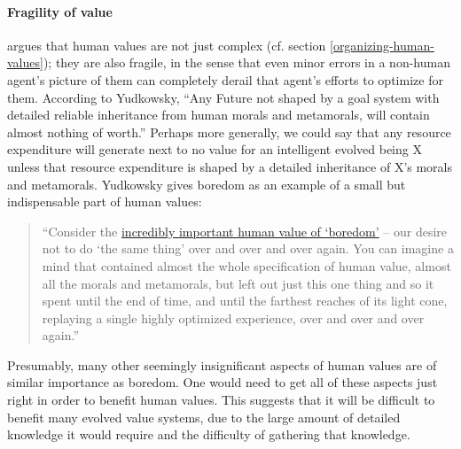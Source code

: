 \hypertarget{fragility-of-value}{\paragraph{Fragility of
value}\label{fragility-of-value}}

\citet[ch. 279]{Yudkowsky2015-tz} argues that human
values are not just complex (cf. section
\ref{organizing-human-values});
they are also fragile, in the sense that even minor errors in a
non-human agent's picture of them can completely derail that agent's
efforts to optimize for them. According to Yudkowsky, ``Any Future not
shaped by a goal system with detailed reliable inheritance from human
morals and metamorals, will contain almost nothing of worth.'' Perhaps
more generally, we could say that any resource expenditure will generate
next to no value for an intelligent evolved being X unless that resource
expenditure is shaped by a detailed inheritance of X's morals and
metamorals. Yudkowsky gives boredom as an example of a small but
indispensable part of human values:

\begin{quote}
``Consider the
\href{http://lesswrong.com/lw/xr/in_praise_of_boredom/}{incredibly
important human value of `boredom'} -- our desire not to do `the same
thing' over and over and over again. You can imagine a mind that
contained almost the whole specification of human value, almost all the
morals and metamorals, but left out just this one thing and so it spent
until the end of time, and until the farthest reaches of its light cone,
replaying a single highly optimized experience, over and over and over
again.''
\end{quote}

Presumably, many other seemingly insignificant aspects of human values
are of similar importance as boredom. One would need to get all of these
aspects just right in order to benefit human values. This suggests that
it will be difficult to benefit many evolved value systems, due to the
large amount of detailed knowledge it would require and the difficulty
of gathering that knowledge.

